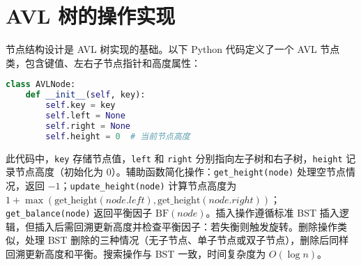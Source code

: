 \chapter{AVL 树的操作实现}
节点结构设计是 AVL 树实现的基础。以下 Python 代码定义了一个 AVL 节点类，包含键值、左右子节点指针和高度属性：\par
\begin{lstlisting}[language=python]
class AVLNode:
    def __init__(self, key):
        self.key = key
        self.left = None
        self.right = None
        self.height = 0  # 当前节点高度
\end{lstlisting}
此代码中，\texttt{key} 存储节点值，\texttt{left} 和 \texttt{right} 分别指向左子树和右子树，\texttt{height} 记录节点高度（初始化为 0）。辅助函数简化操作：\texttt{get\_{}height(node)} 处理空节点情况，返回 $-1$；\texttt{update\_{}height(node)} 计算节点高度为 $1 + \max(\text{get\_height}(node.left), \text{get\_height}(node.right))$；\texttt{get\_{}balance(node)} 返回平衡因子 $\text{BF}(node)$。插入操作遵循标准 BST 插入逻辑，但插入后需回溯更新高度并检查平衡因子：若失衡则触发旋转。删除操作类似，处理 BST 删除的三种情况（无子节点、单子节点或双子节点），删除后同样回溯更新高度和平衡。搜索操作与 BST 一致，时间复杂度为 $O(\log n)$。\par
